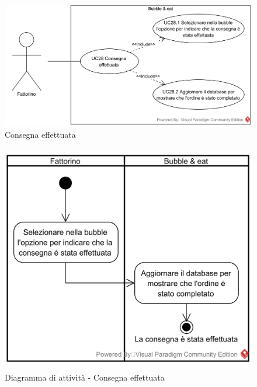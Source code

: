 
\begin{figure}[H]
	\centering
	\includegraphics[width=15cm]{../../documenti/AnalisiDeiRequisiti/Diagrammi_img/usecase/uc3_11.png}
	\caption{\UCCaption{} Consegna effettuata}
\end{figure}

\begin{figure}[H]
	\centering
	\includegraphics[height=10cm]{../../documenti/AnalisiDeiRequisiti/Diagrammi_img/attivita/uc_bubble_consegna_effettuata.png}
	\caption{Diagramma di attività - Consegna effettuata}
\end{figure}

